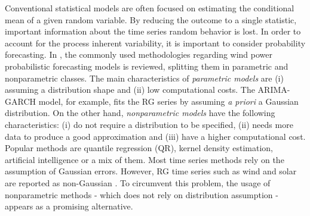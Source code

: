 
Conventional statistical models are often focused on estimating the conditional mean of a given random variable. %
By reducing the outcome to a single statistic, important information about the time series random behavior is lost. In order to account for the process inherent variability, it is important to consider probability forecasting.
In \cite{zhang_review_2014}, the commonly used methodologies regarding wind power probabilistic forecasting models is reviewed, splitting them in parametric and nonparametric classes. The main characteristics of \emph{parametric models} are (i) assuming a distribution shape and (ii) low computational costs. The ARIMA-GARCH model, for example, fits the RG series by assuming \emph{a priori} a Gaussian distribution. On the other hand, \emph{nonparametric models} have the following characteristics: (i) do not require a distribution to be specified, (ii) needs more data to produce a good approximation and (iii) have a higher computational cost. Popular methods are quantile regression (QR), kernel density estimation,  artificial intelligence or a mix of them.
Most time series methods rely on the assumption of Gaussian errors. However, RG time series such as wind and solar are reported as non-Gaussian \cite{bessa2012time,jeon2012using,taylor2015forecasting,Wan2017}. To circumvent this problem, the usage of nonparametric methods - which does not rely on distribution assumption - appears as a promising alternative. 

